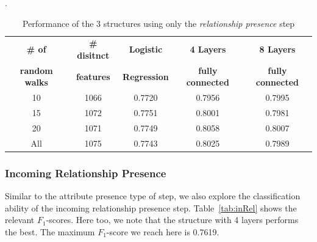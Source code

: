 \documentclass[runningheads,a4paper]{IEEEtran}
\begin{document}

\begin{table}[h]
\centering
\caption{Performance of the 3 structures using only the \textit{relationship presence} step}
\label{tab:rel}.
  \begin{tabular}{ | c | c | c | c | c | }
    \hline
    \textbf{\# of}  & \textbf{\# disitnct} & \textbf{Logistic } & \textbf{4 Layers} & \textbf{8 Layers} \\
    \textbf{random walks} &\textbf{features} &\textbf{ Regression} & \textbf{fully connected} & \textbf{fully connected}\\
    \hline
    10 &1066 & 0.7720 & 0.7956 & 0.7995\\
    \hline
    15 & 1072& 0.7751 & 0.8001 & 0.7981\\
    \hline
    20 & 1071 & 0.7749 & 0.8058 & 0.8007\\
    \hline
    All & 1075& 0.7743& 0.8025 & 0.7989\\
    \hline
  \end{tabular}
\end{table}

\subsubsection{Incoming Relationship Presence} 
Similar to the attribute presence type of step, we also explore the classification ability of the incoming relationship presence step. Table~\ref{tab:inRel} shows the relevant $F_1$-scores. Here too, we note that the structure with 4 layers performs the best. The maximum $F_1$-score we reach here is 0.7619.

\end{document}
